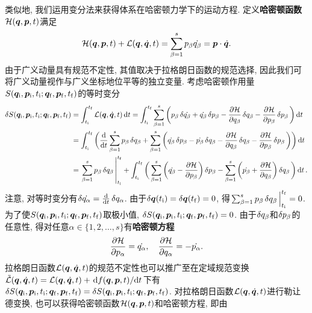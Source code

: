 类似地, 我们运用变分法来获得体系在哈密顿力学下的运动方程. 定义\textbf{哈密顿函数}$ \mathcal{H}(\vb*{q},\vb*{p},t) $满足
\begin{equation}
    \mathcal{H}(\vb*{q},\vb*{p},t) + \mathcal{L}(\vb*{q},\dot{\vb*{q}},t) = \sum_{\beta=1}^s p_{\beta}\dot{q_{\beta}} = \vb*{p} \cdot \dot{\vb*{q}}.
\end{equation}
由于广义动量具有规范不定性, 其值取决于拉格朗日函数的规范选择, 因此我们可将广义动量视作与广义坐标地位平等的独立变量. 考虑哈密顿作用量$ S(\vb*{q}_{\mathrm{i}},\vb*{p}_{\mathrm{i}},t_{\mathrm{i}};\vb*{q}_{\mathrm{f}},\vb*{p}_{\mathrm{f}},t_{\mathrm{f}}) $的等时变分
\begin{align*}
    \var{\action(\vb*{q}_{\init},\vb*{p}_{\init},t_{\init};\vb*{q}_{\fini},\vb*{p}_{\fini},t_{\fini})} &=\int_{t_{\init}}^{t_{\fini}} \lagr(\vb*{q},\dot{\vb*{q}},t) \dd{t} = \int_{t_{\init}}^{t_{\fini}} \sum_{\beta=1}^s\bigg(p_{\beta} \var{\dot{q_{\beta}}} + \dot{q_{\beta}} \var{p_{\beta}} - \pdv{\hami}{q_{\beta}}\var{q_{\beta}} - \pdv{\hami}{p_{\beta}}\var{p_{\beta}}\bigg) \dd{t}\\
    &=\int_{t_{\init}}^{t_{\fini}} \bigg(\dv{t} \sum_{\beta=1}^s p_{\beta} \var{q_{\beta}} +\sum_{\beta=1}^s \bigg(\dot{q_{\beta}} \var{p_{\beta}} - \dot{p_{\beta}} \var{q_{\beta}} - \pdv{\hami}{q_{\beta}}\var{q_{\beta}} - \pdv{\hami}{p_{\beta}}\var{p_{\beta}} \bigg)\bigg) \dd{t}\\
    &=\eval{\sum_{\beta=1}^s p_{\beta} \var{q_{\beta}}}_{t_{\init}}^{t_{\fini}} + \int_{t_{\init}}^{t_{\fini}} \bigg(\sum_{\beta=1}^s \bigg(\dot{q_{\beta}} - \pdv{\hami}{p_{\beta}} \bigg)\var{p_{\beta}} - \sum_{\beta=1}^s \bigg(\dot{p_{\beta}} + \pdv{\hami}{q_{\beta}} \bigg)\var{q_{\beta}} \bigg) \dd{t}.
\end{align*}
注意, 对等时变分有$ \var{\dot{q_{\alpha}}} = \dv{t} \var{q_{\alpha}} $. 由于$ \var{\vb*{q}(t_{\mathrm{i}})}=\var{\vb*{q}(t_{\mathrm{f}})}=0 $, 得$ \eval{\sum_{\beta=1}^s p_{\beta} \var{q_{\beta}}}_{t_{\init}}^{t_{\fini}}=0 $. 为了使$ S(\vb*{q}_{\mathrm{i}},\vb*{p}_{\mathrm{i}},t_{\mathrm{i}};\vb*{q}_{\mathrm{f}},\vb*{p}_{\mathrm{f}},t_{\mathrm{f}}) $取极小值, $ \var{S(\vb*{q}_{\mathrm{i}},\vb*{p}_{\mathrm{i}},t_{\mathrm{i}};\vb*{q}_{\mathrm{f}},\vb*{p}_{\mathrm{f}},t_{\mathrm{f}})}=0 $. 由于$ \var{q_{\beta}} $和$ \var{p_{\beta}} $的任意性, 得对任意$ \alpha \in \{1,2,\ldots,s\} $有\textbf{哈密顿方程}
\begin{equation}
    \pdv{\mathcal{H}}{p_{\alpha}} = \dot{q_{\alpha}}, \quad \pdv{\mathcal{H}}{q_{\alpha}} = -\dot{p_{\alpha}}.
\end{equation}
拉格朗日函数$ \mathcal{L}(\vb*{q},\dot{\vb*{q}},t) $的规范不定性也可以推广至在定域规范变换$ \tilde{\mathcal{L}}(\vb*{q},\dot{\vb*{q}},t)=\mathcal{L}(\vb*{q},\dot{\vb*{q}},t)+\dv*{f(\vb*{q},\vb*{p},t)}{t} $下有$ \var{S(\vb*{q}_{\mathrm{i}},\vb*{p}_{\mathrm{i}},t_{\mathrm{i}};\vb*{q}_{\mathrm{f}},\vb*{p}_{\mathrm{f}},t_{\mathrm{f}})}=\var{S(\vb*{q}_{\mathrm{i}},\vb*{p}_{\mathrm{i}},t_{\mathrm{i}};\vb*{q}_{\mathrm{f}},\vb*{p}_{\mathrm{f}},t_{\mathrm{f}})} $. 对拉格朗日函数$ \mathcal{L}(\vb*{q},\dot{\vb*{q}},t) $进行勒让德变换, 也可以获得哈密顿函数$ \mathcal{H}(\vb*{q},\vb*{p},t) $和哈密顿方程, 即由
